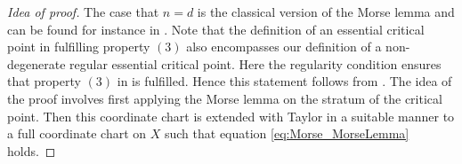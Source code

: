 \begin{proof}[Idea of proof]
  The case that $n=d$ is the classical version of the Morse lemma and can be found for instance
  in \cite[§6, Lemma 1.1]{Hirsch1994}.
  Note that the definition of an essential critical point in \cite{Handron2002} 
  fulfilling property $(3)$ also encompasses our definition of a non-degenerate regular
  essential critical point. Here the regularity condition ensures that property $(3)$ in \cite{Handron2002}
  is fulfilled. Hence this statement follows from \cite[Lemma 5]{Handron2002}.
  The idea of the proof involves first applying the Morse lemma on the stratum of the critical point.
  Then this coordinate chart is extended with Taylor in a suitable manner to a
  full coordinate chart on $X$ such that equation \eqref{eq:Morse_MorseLemma} holds.
\end{proof}

